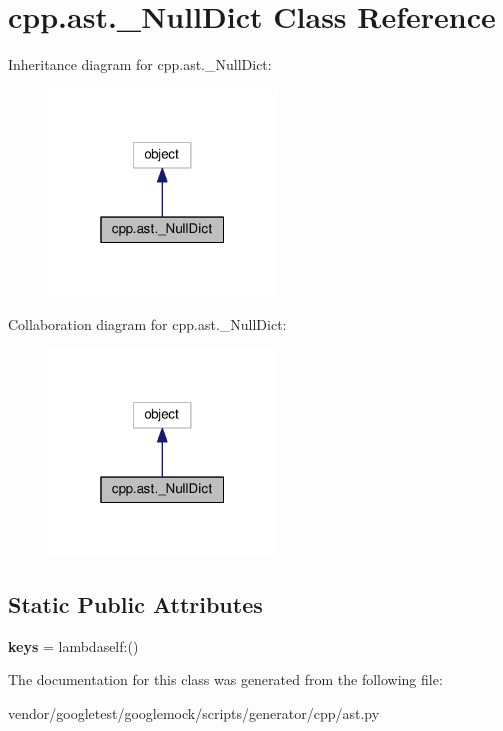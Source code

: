 \hypertarget{classcpp_1_1ast_1_1__NullDict}{}\section{cpp.\+ast.\+\_\+\+Null\+Dict Class Reference}
\label{classcpp_1_1ast_1_1__NullDict}


Inheritance diagram for cpp.\+ast.\+\_\+\+Null\+Dict\+:\nopagebreak
\begin{figure}[H]
\begin{center}
\leavevmode
\includegraphics[width=172pt]{classcpp_1_1ast_1_1__NullDict__inherit__graph}
\end{center}
\end{figure}


Collaboration diagram for cpp.\+ast.\+\_\+\+Null\+Dict\+:\nopagebreak
\begin{figure}[H]
\begin{center}
\leavevmode
\includegraphics[width=172pt]{classcpp_1_1ast_1_1__NullDict__coll__graph}
\end{center}
\end{figure}
\subsection*{Static Public Attributes}
\begin{DoxyCompactItemize}
\item 
{\bfseries keys} = lambdaself\+:()\hypertarget{classcpp_1_1ast_1_1__NullDict_abb0b7884aa59bede0a8503dffcd1733f}{}\label{classcpp_1_1ast_1_1__NullDict_abb0b7884aa59bede0a8503dffcd1733f}

\end{DoxyCompactItemize}


The documentation for this class was generated from the following file\+:\begin{DoxyCompactItemize}
\item 
vendor/googletest/googlemock/scripts/generator/cpp/ast.\+py\end{DoxyCompactItemize}
